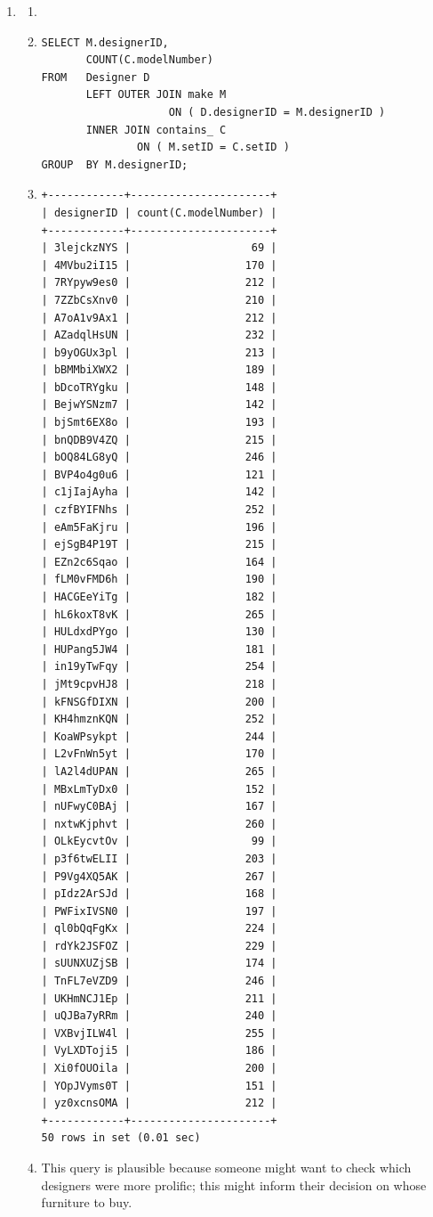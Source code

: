 \documentclass[american,extrafontsizes,12pt,portrait,letterpaper,oneside,onecolumn,final]{memoir}
\begin{document}
\begin{enumerate}[leftmargin=*,label={\strong{\uline{(\emph{\Alph*})}}}]
\item
\begin{enumerate}[leftmargin=*,widest={\strong{Explanation:}}]
\item[\strong{Intent:}] 
\item[\strong{Query:}]
\begin{verbatim}
SELECT M.designerID,
       COUNT(C.modelNumber)
FROM   Designer D
       LEFT OUTER JOIN make M
                    ON ( D.designerID = M.designerID )
       INNER JOIN contains_ C
               ON ( M.setID = C.setID )
GROUP  BY M.designerID;
\end{verbatim}
\item[\strong{Result:}]
\begin{verbatim}
+------------+----------------------+
| designerID | count(C.modelNumber) |
+------------+----------------------+
| 3lejckzNYS |                   69 |
| 4MVbu2iI15 |                  170 |
| 7RYpyw9es0 |                  212 |
| 7ZZbCsXnv0 |                  210 |
| A7oA1v9Ax1 |                  212 |
| AZadqlHsUN |                  232 |
| b9yOGUx3pl |                  213 |
| bBMMbiXWX2 |                  189 |
| bDcoTRYgku |                  148 |
| BejwYSNzm7 |                  142 |
| bjSmt6EX8o |                  193 |
| bnQDB9V4ZQ |                  215 |
| bOQ84LG8yQ |                  246 |
| BVP4o4g0u6 |                  121 |
| c1jIajAyha |                  142 |
| czfBYIFNhs |                  252 |
| eAm5FaKjru |                  196 |
| ejSgB4P19T |                  215 |
| EZn2c6Sqao |                  164 |
| fLM0vFMD6h |                  190 |
| HACGEeYiTg |                  182 |
| hL6koxT8vK |                  265 |
| HULdxdPYgo |                  130 |
| HUPang5JW4 |                  181 |
| in19yTwFqy |                  254 |
| jMt9cpvHJ8 |                  218 |
| kFNSGfDIXN |                  200 |
| KH4hmznKQN |                  252 |
| KoaWPsykpt |                  244 |
| L2vFnWn5yt |                  170 |
| lA2l4dUPAN |                  265 |
| MBxLmTyDx0 |                  152 |
| nUFwyC0BAj |                  167 |
| nxtwKjphvt |                  260 |
| OLkEycvtOv |                   99 |
| p3f6twELII |                  203 |
| P9Vg4XQ5AK |                  267 |
| pIdz2ArSJd |                  168 |
| PWFixIVSN0 |                  197 |
| ql0bQqFgKx |                  224 |
| rdYk2JSFOZ |                  229 |
| sUUNXUZjSB |                  174 |
| TnFL7eVZD9 |                  246 |
| UKHmNCJ1Ep |                  211 |
| uQJBa7yRRm |                  240 |
| VXBvjILW4l |                  255 |
| VyLXDToji5 |                  186 |
| Xi0fOUOila |                  200 |
| YOpJVyms0T |                  151 |
| yz0xcnsOMA |                  212 |
+------------+----------------------+
50 rows in set (0.01 sec)
\end{verbatim}
\item[\strong{Explanation:}] This query is plausible because someone might want to check which designers were more prolific; this might inform their decision on whose furniture to buy.


\end{enumerate}
\end{enumerate}
\end{document}

